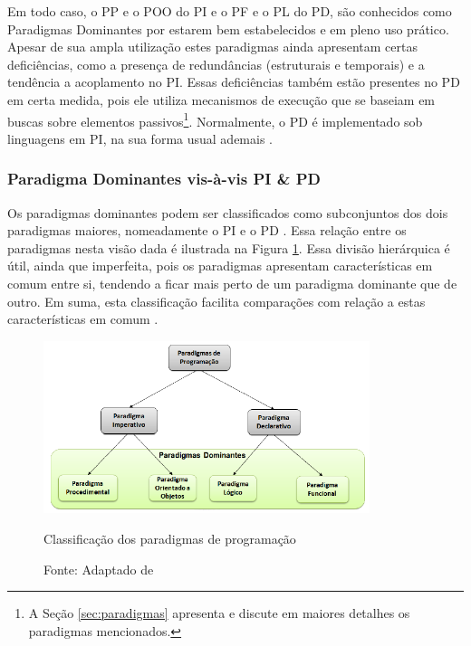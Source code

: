 
Em todo caso, o PP e o POO do PI e o PF e o PL do PD, são conhecidos como
Paradigmas Dominantes por estarem bem estabelecidos e em pleno uso prático.
Apesar de sua ampla utilização estes paradigmas ainda apresentam certas
deficiências, como a presença de redundâncias (estruturais e temporais) e a
tendência a acoplamento no PI. Essas deficiências também estão presentes no PD
em certa medida, pois ele utiliza mecanismos de execução que se baseiam em
buscas sobre elementos passivos\footnote{A Seção \ref{sec:paradigmas} apresenta
e discute em maiores detalhes os paradigmas mencionados.}. Normalmente, o PD é
implementado sob linguagens em PI, na sua forma usual ademais
\cite{msc_Banaszewski_2009,doc_ronszcka_2019}.

\subsubsection{Paradigma Dominantes vis-à-vis PI \& PD}


Os paradigmas dominantes podem ser classificados como subconjuntos dos dois
paradigmas maiores, nomeadamente o PI e o PD \cite{msc_Banaszewski_2009}. Essa
relação entre os paradigmas nesta visão dada é ilustrada na Figura
\ref{fig:classificacao}. Essa divisão hierárquica é útil, ainda que imperfeita,
pois os paradigmas apresentam características em comum entre si, tendendo a
ficar mais perto de um paradigma dominante que de outro. Em suma, esta
classificação facilita comparações com relação a estas características em comum
\cite{doc_ronszcka_2019}.

\begin{figure}[!htb]
  \centering
  \includegraphics[width=0.85\textwidth]{../figures/classificacao_cut2.png}
  \caption{Classificação dos paradigmas de programação}
  \caption*{Fonte: Adaptado de }
  \label{fig:classificacao}
\end{figure}

